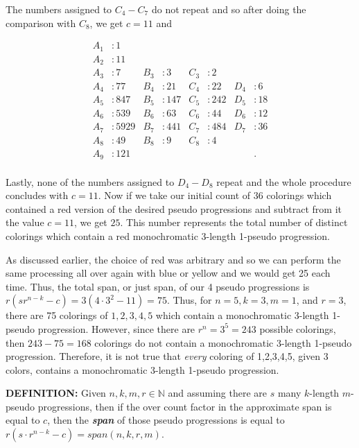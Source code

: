 \documentclass[12pt, a4paper]{article}
\begin{document}
\newpage

\noindent The numbers assigned to $C_4-C_7$ do not repeat and so after doing the comparison with $C_8$, we get $c=11$ and 

\begin{align*}
        A_1 & : 1 &  &  &  &  &  & \\
        A_2 & : 11 &  &  &  &  &  & \\ 
        A_3 & : 7 & B_3 & : 3 & C_3 & : 2&  & \\ 
        A_4 & : 77 & B_4 & : 21 & C_4 & : 22& D_4 & : 6\\
        A_5 & : 847 & B_5 & : 147& C_5 & : 242& D_5 & : 18\\ 
        A_6 & : 539& B_6 & : 63& C_6 & : 44& D_6 & : 12\\ 
        A_7 & : 5929& B_7 & :441 & C_7 & : 484& D_7 & : 36 \\ 
        A_8 & : 49& B_8 & : 9 & C_8 & : 4&  &  \\ 
        A_9 & : 121& & & & &  & . \\ 
\end{align*}

\noindent Lastly, none of the numbers assigned to $D_4-D_8$ repeat and the whole procedure concludes with $c=11$. Now if we take our initial count of $36$ colorings which contained a red version of the desired pseudo progressions and subtract from it the value $c=11$, we get $25$. This number represents the total number of distinct colorings which contain a red monochromatic 3-length 1-pseudo progression. \par
As discussed earlier, the choice of red was arbitrary and so we can perform the same processing all over again with blue or yellow and we would get 25 each time. Thus, the total span, or just span, of our 4 pseudo progressions is $r(sr^{n-k}-c)=3(4\cdot3^2-11)=75$. Thus, for $n=5, k=3,m=1$, and $r=3$, there are 75 colorings of $1,2,3,4,5$ which contain a monochromatic 3-length 1-pseudo progression. However, since there are $r^n=3^5=243$ possible colorings, then $243-75=168$ colorings do not contain a monochromatic 3-length 1-pseudo progression. Therefore, it is not true that \textit{every} coloring of 1,2,3,4,5, given 3 colors, contains a monochromatic 3-length 1-pseudo progression.

\vspace{6mm}

\noindent\textbf{DEFINITION: } Given $n,k,m,r\in\mathbb{N}$ and assuming there are $s$ many $k$-length $m$-pseudo progressions, then if the over count factor in the approximate span is equal to $c$, then the \textit{\textbf{span}} of those pseudo progressions is equal to $r(s\cdot r^{n-k}-c)=span(n,k,r,m)$.
\end{document}
